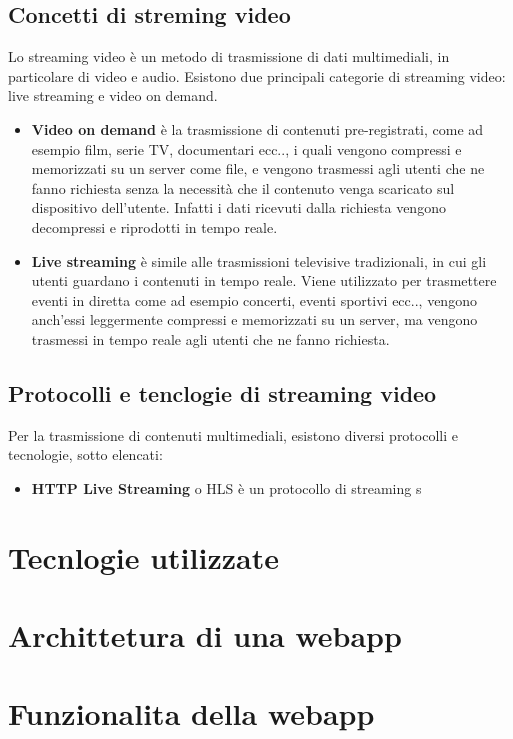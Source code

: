 \subsection{Concetti di streming video}
Lo streaming video è un metodo di trasmissione di dati multimediali, in particolare di video e audio.
Esistono due principali categorie di streaming video: live streaming e video on demand.\\
\begin{itemize}
    \item \textbf{Video on demand} è la trasmissione di contenuti pre-registrati, come ad esempio film, serie TV, documentari ecc.., i quali vengono compressi e memorizzati su un server come file,
    e vengono trasmessi agli utenti che ne fanno richiesta senza la necessità che il contenuto venga scaricato sul dispositivo dell'utente. Infatti i dati ricevuti dalla richiesta vengono decompressi e riprodotti in tempo reale.
    \item \textbf{Live streaming} è simile alle trasmissioni televisive tradizionali, in cui gli utenti guardano i contenuti in tempo reale. Viene utilizzato per trasmettere eventi in 
    diretta come ad esempio concerti, eventi sportivi ecc.., vengono anch'essi leggermente compressi e memorizzati su un server, ma vengono trasmessi in tempo reale agli utenti che ne fanno richiesta.
    \end{itemize}
\subsection{Protocolli e tenclogie di streaming video}
Per la trasmissione di contenuti multimediali, esistono diversi protocolli e tecnologie, sotto elencati:

\begin{itemize}

    \item \textbf{HTTP Live Streaming} o HLS è un protocollo di streaming s
    \end{itemize}


\section{Tecnlogie utilizzate}

\section{Archittetura di una webapp}

\section{Funzionalita della webapp}